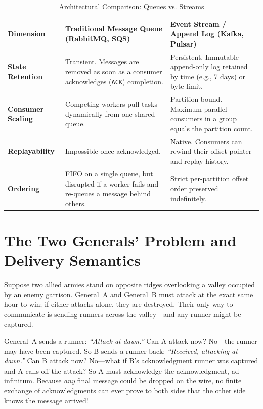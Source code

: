 \begin{table}[htbp]
\centering\small
\begin{tabular}{lp{5.5cm}p{5.5cm}}
\toprule
\textbf{Dimension} & \textbf{Traditional Message Queue (RabbitMQ, SQS)} & \textbf{Event Stream / Append Log (Kafka, Pulsar)} \\
\midrule
\textbf{State Retention} & Transient. Messages are removed as soon as a consumer acknowledges (\texttt{ACK}) completion. & Persistent. Immutable append-only log retained by time (e.g., 7 days) or byte limit. \\
\textbf{Consumer Scaling} & Competing workers pull tasks dynamically from one shared queue. & Partition-bound. Maximum parallel consumers in a group equals the partition count. \\
\textbf{Replayability} & Impossible once acknowledged. & Native. Consumers can rewind their offset pointer and replay history. \\
\textbf{Ordering} & FIFO on a single queue, but disrupted if a worker fails and re-queues a message behind others. & Strict per-partition offset order preserved indefinitely. \\
\bottomrule
\end{tabular}
\caption{Architectural Comparison: Queues vs. Streams}
\label{tab:v4-ch04-queue-vs-stream}
\end{table}

\section{The Two Generals' Problem and Delivery Semantics}

Suppose two allied armies stand on opposite ridges overlooking a valley occupied by an enemy garrison. General~A and General~B must attack at the exact same hour to win; if either attacks alone, they are destroyed. Their only way to communicate is sending runners across the valley---and any runner might be captured.

\begin{intuitionbox}
General~A sends a runner: \emph{``Attack at dawn.''} Can A attack now? No---the runner may have been captured. So B sends a runner back: \emph{``Received, attacking at dawn.''} Can B attack now? No---what if B's acknowledgment runner was captured and A calls off the attack? So A must acknowledge the acknowledgment, ad infinitum. Because \emph{any} final message could be dropped on the wire, no finite exchange of acknowledgments can ever prove to both sides that the other side knows the message arrived!
\end{intuitionbox}

